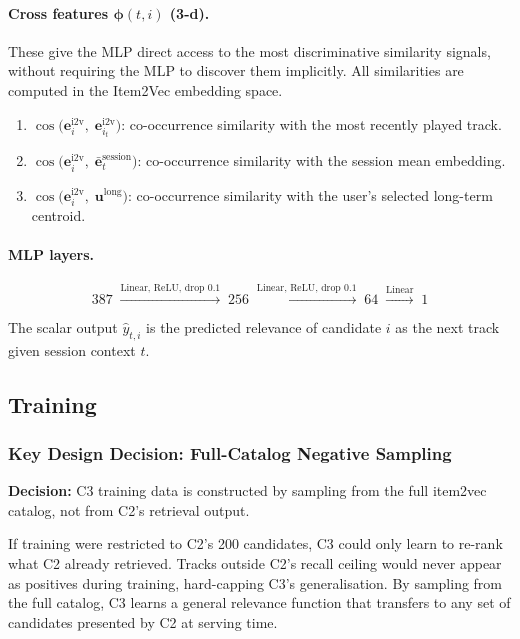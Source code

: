 \documentclass[11pt]{article}
\newcommand{\decision}[1]{\textcolor{decisionblue}{\textbf{Decision:} #1}}
\begin{document}
\paragraph{Cross features $\bm{\phi}(t, i)$ (3-d).}
These give the MLP direct access to the most discriminative similarity
signals, without requiring the MLP to discover them implicitly.
All similarities are computed in the Item2Vec embedding space.
\begin{enumerate}
  \item $\cos\!\bigl(\mathbf{e}^{\text{i2v}}_i,\;
        \mathbf{e}^{\text{i2v}}_{i_t}\bigr)$:
        co-occurrence similarity with the most recently played track.
  \item $\cos\!\bigl(\mathbf{e}^{\text{i2v}}_i,\;
        \bar{\mathbf{e}}^{\text{session}}_t\bigr)$:
        co-occurrence similarity with the session mean embedding.
  \item $\cos\!\bigl(\mathbf{e}^{\text{i2v}}_i,\;
        \mathbf{u}^{\text{long}}\bigr)$:
        co-occurrence similarity with the user's selected long-term centroid.
\end{enumerate}

\paragraph{MLP layers.}
\[
  387
  \;\xrightarrow{\text{Linear, ReLU, drop 0.1}}\;
  256
  \;\xrightarrow{\text{Linear, ReLU, drop 0.1}}\;
  64
  \;\xrightarrow{\text{Linear}}\;
  1
\]

The scalar output $\hat{y}_{t,i}$ is the predicted relevance of
candidate $i$ as the next track given session context $t$.

\subsection{Training}
\label{sec:c3training}

\subsubsection{Key Design Decision: Full-Catalog Negative Sampling}

\decision{C3 training data is constructed by sampling from the full
item2vec catalog, not from C2's retrieval output.}

If training were restricted to C2's 200 candidates, C3 could only
learn to re-rank what C2 already retrieved. Tracks outside C2's
recall ceiling would never appear as positives during training,
hard-capping C3's generalisation. By sampling from the full catalog,
C3 learns a general relevance function that transfers to any set of
candidates presented by C2 at serving time.
\end{document}
